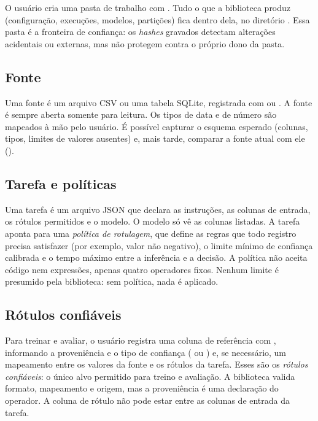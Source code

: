 O usuário cria uma pasta de trabalho com . Tudo o que a biblioteca produz (configuração, execuções, modelos, partições) fica dentro dela, no diretório . Essa pasta é a fronteira de confiança: os \emph{hashes} gravados detectam alterações acidentais ou externas, mas não protegem contra o próprio dono da pasta.

\subsection{Fonte}

Uma fonte é um arquivo CSV ou uma tabela SQLite, registrada com  ou . A fonte é sempre aberta somente para leitura. Os tipos de data e de número são mapeados à mão pelo usuário. É possível capturar o esquema esperado (colunas, tipos, limites de valores ausentes) e, mais tarde, comparar a fonte atual com ele ().

\subsection{Tarefa e políticas}

Uma tarefa é um arquivo JSON que declara as instruções, as colunas de entrada, os rótulos permitidos e o modelo. O modelo só vê as colunas listadas. A tarefa aponta para uma \emph{política de rotulagem}, que define as regras que todo registro precisa satisfazer (por exemplo, valor não negativo), o limite mínimo de confiança calibrada e o tempo máximo entre a inferência e a decisão. A política não aceita código nem expressões, apenas quatro operadores fixos. Nenhum limite é presumido pela biblioteca: sem política, nada é aplicado.

\subsection{Rótulos confiáveis}

Para treinar e avaliar, o usuário registra uma coluna de referência com , informando a proveniência e o tipo de confiança ( ou ) e, se necessário, um mapeamento entre os valores da fonte e os rótulos da tarefa. Esses são os \emph{rótulos confiáveis}: o único alvo permitido para treino e avaliação. A biblioteca valida formato, mapeamento e origem, mas a proveniência é uma declaração do operador. A coluna de rótulo não pode estar entre as colunas de entrada da tarefa.

